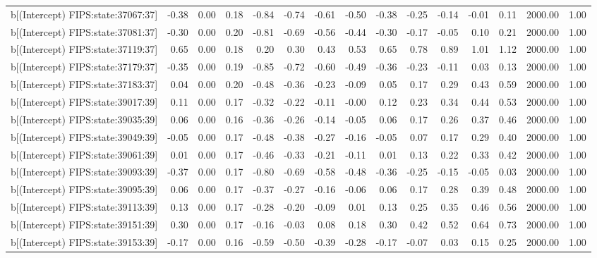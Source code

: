 \begin{table}[ht]
\begin{tabular}{rrrrrrrrrrrrrrr}
  b[(Intercept) FIPS:state:37067:37] & -0.38 & 0.00 & 0.18 & -0.84 & -0.74 & -0.61 & -0.50 & -0.38 & -0.25 & -0.14 & -0.01 & 0.11 & 2000.00 & 1.00 \\ 
  b[(Intercept) FIPS:state:37081:37] & -0.30 & 0.00 & 0.20 & -0.81 & -0.69 & -0.56 & -0.44 & -0.30 & -0.17 & -0.05 & 0.10 & 0.21 & 2000.00 & 1.00 \\ 
  b[(Intercept) FIPS:state:37119:37] & 0.65 & 0.00 & 0.18 & 0.20 & 0.30 & 0.43 & 0.53 & 0.65 & 0.78 & 0.89 & 1.01 & 1.12 & 2000.00 & 1.00 \\ 
  b[(Intercept) FIPS:state:37179:37] & -0.35 & 0.00 & 0.19 & -0.85 & -0.72 & -0.60 & -0.49 & -0.36 & -0.23 & -0.11 & 0.03 & 0.13 & 2000.00 & 1.00 \\ 
  b[(Intercept) FIPS:state:37183:37] & 0.04 & 0.00 & 0.20 & -0.48 & -0.36 & -0.23 & -0.09 & 0.05 & 0.17 & 0.29 & 0.43 & 0.59 & 2000.00 & 1.00 \\ 
  b[(Intercept) FIPS:state:39017:39] & 0.11 & 0.00 & 0.17 & -0.32 & -0.22 & -0.11 & -0.00 & 0.12 & 0.23 & 0.34 & 0.44 & 0.53 & 2000.00 & 1.00 \\ 
  b[(Intercept) FIPS:state:39035:39] & 0.06 & 0.00 & 0.16 & -0.36 & -0.26 & -0.14 & -0.05 & 0.06 & 0.17 & 0.26 & 0.37 & 0.46 & 2000.00 & 1.00 \\ 
  b[(Intercept) FIPS:state:39049:39] & -0.05 & 0.00 & 0.17 & -0.48 & -0.38 & -0.27 & -0.16 & -0.05 & 0.07 & 0.17 & 0.29 & 0.40 & 2000.00 & 1.00 \\ 
  b[(Intercept) FIPS:state:39061:39] & 0.01 & 0.00 & 0.17 & -0.46 & -0.33 & -0.21 & -0.11 & 0.01 & 0.13 & 0.22 & 0.33 & 0.42 & 2000.00 & 1.00 \\ 
  b[(Intercept) FIPS:state:39093:39] & -0.37 & 0.00 & 0.17 & -0.80 & -0.69 & -0.58 & -0.48 & -0.36 & -0.25 & -0.15 & -0.05 & 0.03 & 2000.00 & 1.00 \\ 
  b[(Intercept) FIPS:state:39095:39] & 0.06 & 0.00 & 0.17 & -0.37 & -0.27 & -0.16 & -0.06 & 0.06 & 0.17 & 0.28 & 0.39 & 0.48 & 2000.00 & 1.00 \\ 
  b[(Intercept) FIPS:state:39113:39] & 0.13 & 0.00 & 0.17 & -0.28 & -0.20 & -0.09 & 0.01 & 0.13 & 0.25 & 0.35 & 0.46 & 0.56 & 2000.00 & 1.00 \\ 
  b[(Intercept) FIPS:state:39151:39] & 0.30 & 0.00 & 0.17 & -0.16 & -0.03 & 0.08 & 0.18 & 0.30 & 0.42 & 0.52 & 0.64 & 0.73 & 2000.00 & 1.00 \\ 
  b[(Intercept) FIPS:state:39153:39] & -0.17 & 0.00 & 0.16 & -0.59 & -0.50 & -0.39 & -0.28 & -0.17 & -0.07 & 0.03 & 0.15 & 0.25 & 2000.00 & 1.00 \\ 

\end{tabular}
\end{table}
